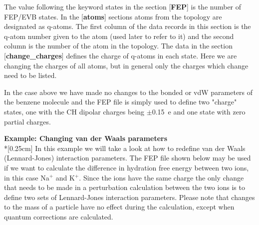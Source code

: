 \documentclass[a4paper,11pt]{article}
\begin{document}
The value following the keyword states in the section
[\textbf{FEP}] is the number of FEP/EVB states. In the
[\textbf{atoms}] sections atoms from the topology are designated
as q-atoms. The first column of the data records in this section
is the q-atom number given to the atom (used later to refer to it)
and the second column is the number of the atom in the topology.
The data in the section [\textbf{change{\_}charges}] defines the
charge of q-atoms in each state. Here we are changing the charges
of all atoms, but in general only the charges which change need to
be listed.

In the case above we have made no changes to the bonded or vdW
parameters of the benzene molecule and the FEP file is simply used
to define two "charge" states, one with the CH dipolar charges
being $\pm $0.15~e and one state with zero partial charges.

\textbf{Example: Changing van der Waals parameters}\\*[0.25cm] In
this example we will take a look at how to redefine van der Waals
(Lennard-Jones) interaction parameters. The FEP file shown below
may be used if we want to calculate the difference in hydration
free energy between two ions, in this case Na$^{+}$ and K$^{+}$.
Since the ions have the same charge the only change that needs to
be made in a perturbation calculation between the two ions is to
define two sets of Lennard-Jones interaction parameters. Please note
that changes to the mass of a particle have no effect during the
calculation, except when quantum corrections are calculated.

\setcounter{table}{3}
\end{document}
